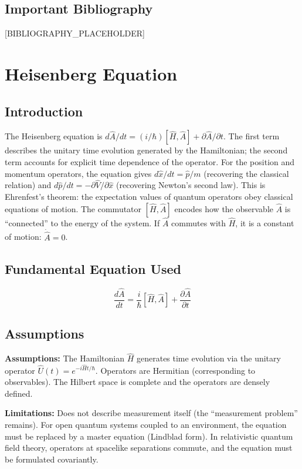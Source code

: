 \documentclass[11pt,openright]{book}
\begin{document}
\section*{Important Bibliography}

[BIBLIOGRAPHY_PLACEHOLDER]


\chapter{Heisenberg Equation}

\section*{Introduction}

The Heisenberg equation is $d\hat{A}/dt = (i/\hbar)[\hat{H}, \hat{A}] + \partial\hat{A}/\partial t$. The first term describes the unitary time evolution generated by the Hamiltonian; the second term accounts for explicit time dependence of the operator. For the position and momentum operators, the equation gives $d\hat{x}/dt = \hat{p}/m$ (recovering the classical relation) and $d\hat{p}/dt = -\partial\hat{V}/\partial\hat{x}$ (recovering Newton's second law). This is Ehrenfest's theorem: the expectation values of quantum operators obey classical equations of motion. The commutator $[\hat{H}, \hat{A}]$ encodes how the observable $\hat{A}$ is ``connected'' to the energy of the system. If $\hat{A}$ commutes with $\hat{H}$, it is a constant of motion: $\dot{\hat{A}} = 0$.
\section*{Fundamental Equation Used}

\[
\frac{d\hat{A}}{dt}=\frac{i}{\hbar}[\hat{H},\hat{A}]+\frac{\partial\hat{A}}{\partial t}
\]
\section*{Assumptions}

\textbf{Assumptions:} The Hamiltonian $\hat{H}$ generates time evolution via the unitary operator $\hat{U}(t) = e^{-i\hat{H}t/\hbar}$. Operators are Hermitian (corresponding to observables). The Hilbert space is complete and the operators are densely defined.


\textbf{Limitations:} Does not describe measurement itself (the ``measurement problem'' remains). For open quantum systems coupled to an environment, the equation must be replaced by a master equation (Lindblad form). In relativistic quantum field theory, operators at spacelike separations commute, and the equation must be formulated covariantly.
\end{document}
